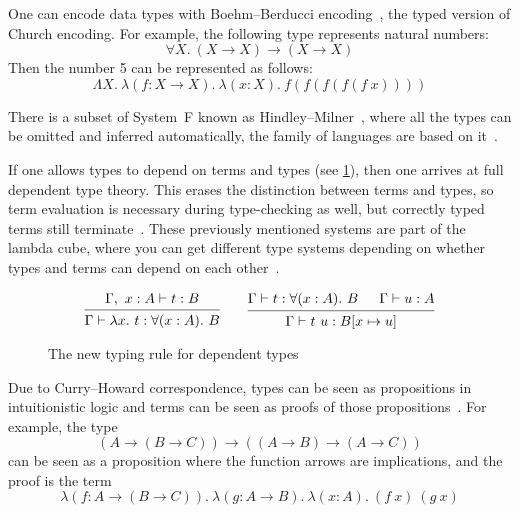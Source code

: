 One can encode data types with Boehm{--}Berducci
encoding~\cite{boehmberarducci}, the typed version of Church encoding. For
example, the following type represents natural numbers:
\begin{equation}
  \forall X.\ (X \to X) \to (X \to X)
  \label{eq:stlc-church-type}
\end{equation}
Then the number 5 can be represented as follows:
\begin{equation}
  \Lambda X.\ \lambda (f : X \to X).\ \lambda (x : X).\ f (f (f (f (f\ x))))
  \label{eq:stlc-church-ex}
\end{equation}

There is a subset of System~F known as Hindley{--}Milner~\cite{milner}, where
all the types can be omitted and inferred automatically, the  family of
languages are based on it~\cite{haskell2010, ml}.

If one allows types to depend on terms and types (see \cref{fig:dep-typing}),
then one arrives at full dependent type theory. This erases the distinction
between terms and types, so term evaluation is necessary during type-checking as
well, but correctly typed terms still terminate~\cite{martinloef, coc,
tt-Nederpelt}. These previously mentioned systems are part of the lambda cube,
where you can get different type systems depending on whether types and terms
can depend on each other~\cite{tt-Nederpelt, lambdacube}.

\begin{figure}
  \begin{equation*}
    \begin{prooftree}
      \hypo{\Gamma,\ x : A \vdash t : B}
      \infer1{\Gamma \vdash \lambda x.\ t : \forall (x : A).\ B}
    \end{prooftree}
    \qquad
    \begin{prooftree}
      \hypo{\Gamma \vdash t : \forall (x : A).\ B}
      \hypo{\Gamma \vdash u : A}
      \infer2{\Gamma \vdash t\ u : B[x \mapsto u]}
    \end{prooftree}
  \end{equation*}
  \caption{The new typing rule for dependent types}\label{fig:dep-typing}
\end{figure}

Due to Curry{--}Howard correspondence, types can be seen as propositions in
intuitionistic logic and terms can be seen as proofs of those
propositions~\cite{prop-Wadler, curryhoward}. For example, the type
\begin{equation}
  (A → (B → C)) → ((A → B) → (A → C))
  \label{eq:curryhoward-type}
\end{equation}
can be seen as a proposition where the function arrows are implications, and the proof is the term
\begin{equation}
  \lambda (f : A → (B → C)).\ \lambda (g : A → B).\ \lambda (x : A).
  \ (f\ x)\ (g\ x)
  \label{eq:curryhoward-term}
\end{equation}
